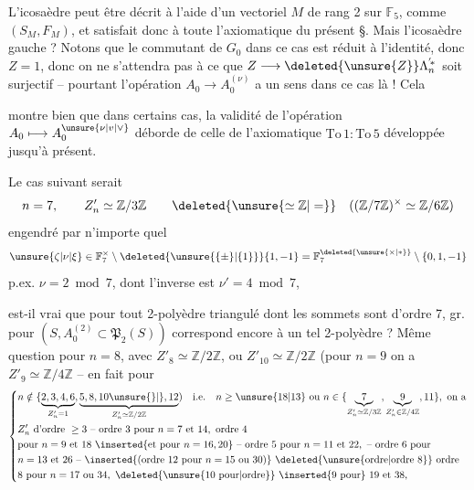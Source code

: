 L'icosaèdre peut être décrit à l'aide d'un vectoriel $M$ de rang 2 sur $\mathbb F_5$, comme $(S_M,F_M)$, et satisfait donc à toute l'axiomatique du présent §. Mais l'icosaèdre gauche ? Notons que le commutant de $G_0$ dans ce cas est réduit à l'identité, donc $Z=1$, donc on ne s'attendra pas à ce que $Z\longrightarrow\deleted{\unsure{Z}}\Lambda_n^{'\!*}$ soit surjectif -- pourtant l'opération $A_0\longrightarrow A_0^{(\nu)}$ a un sens dans ce cas là ! Cela


montre bien que dans certains cas, la validité de l'opération $A_0\longmapsto A_0^{\unsure{\nu|v|\vee}}$ déborde de celle de l'axiomatique $\mathrm{To}\,1:\mathrm{To}\,5$ développée jusqu'à présent.

Le cas suivant serait
\[
 n=7,\qquad Z'_n\simeq\mathbb Z/3\mathbb Z
 \qquad \deleted{\unsure{\simeq\mathbb Z|=}}\quad
 ((\mathbb Z/7\mathbb Z)^\times\simeq\mathbb Z/6\mathbb Z)
\]
engendré par n'importe quel
\[
 \unsure{\zeta|\nu|\xi}\in\mathbb F_7^\times\setminus\deleted{\unsure{\{\pm\}|\{1\}}}\{1,-1\}
 =\mathbb F_7^{\deleted{\unsure{\times|*}}}\setminus\{0,1,-1\}
\]
p.ex. $\nu=2\bmod 7$, dont l'inverse est $\nu'=4\bmod 7$,

est-il vrai que pour tout 2-polyèdre  triangulé  dont les sommets sont  d'ordre 7,   gr. pour $(S,A_0^{(2)}\subset\mathfrak P_2(S))$ correspond encore à un tel 2-polyèdre ? Même question pour $n=8$, avec $Z'_8\simeq\mathbb Z/2\mathbb Z$, ou  $Z'_{10}\simeq\mathbb Z/2\mathbb Z$ (pour $n=9$ on a $Z'_9\simeq\mathbb Z/4\mathbb Z$ -- en fait pour
\[
\left\{\begin{aligned}
&n\notin\{\underbrace{2,3,4,6}_{Z'_n=1},
 \underbrace{5,8,10\unsure{\}|{}},12}_{Z'_n\simeq\mathbb Z/2\mathbb Z})
 \quad\text{i.e.}\quad n\geq\unsure{18|13}\ \text{ou}\ n\in\{
 \underbrace{7}_{Z'_n\simeq\mathbb Z/3\mathbb Z},
 \underbrace{9}_{Z'_n\in\mathbb Z/4\mathbb Z},11\},\ \text{on a}\\
&Z'_n\ \text{d'ordre}\ \geq3\ \text{-- ordre 3 pour}\ n=7\ \text{et }14,\ \text{ordre }4\\
&\text{pour }n=9\ \text{et }18\ \inserted{\text{et pour }n=16,20}\ \text{-- ordre 5 pour }n=11\ \text{et }22,\ \text{-- ordre 6 pour}\\
&n=13\ \text{et }26\ \text{-- }\inserted{\text{(ordre 12 pour }n=15\ \text{ou }30\text{)}}\
  \deleted{\text{\unsure{ordre|ordre 8}}}\ \text{ordre}\\
&8\ \text{pour }n=17\ \text{ou }34,\ \deleted{\text{\unsure{10 pour|ordre}}}\
 \inserted{\text{9 pour}}\ 19\ \text{et }38,
\end{aligned}\right.
\]

